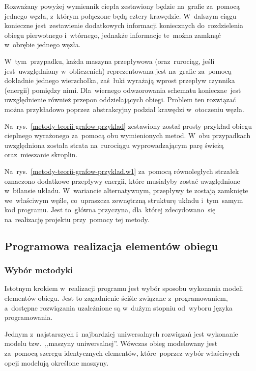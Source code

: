 Rozważany powyżej wymiennik ciepła zestawiony będzie na~grafie za~pomocą
jednego węzła, z~którym połączone będą cztery krawędzie. W~dalszym ciągu
konieczne jest~zestawienie dodatkowych informacji koniecznych
do~rozdzielenia obiegu pierwotnego i~wtórnego, jednakże informacje
te~można zamknąć w~obrębie jednego węzła.

W~tym~przypadku, każda maszyna przepływowa (oraz~rurociąg, jeśli
jest~uwzględniany w~obliczenich) reprezentowana jest na~grafie za~pomocą
dokładnie jednego wierzchołka, zaś~łuki wyrażają wprost przepływ
czynnika (energii) pomiędzy nimi. Dla~wiernego odwzorowania schematu
konieczne~jest uwzględnienie również przepon oddzielających obiegi.
Problem ten rozwiązać można przykładowo poprzez~abstrakcyjny podział
krawędzi w~otoczeniu węzła.

Na~rys.~\ref{metody-teorii-grafow-przyklad} zestawiony został prosty
przykład obiegu cieplnego wyrażonego za~pomocą obu wymienionych metod.
W~obu przypadkach uwzględniona została strata na~rurociągu
wyprowadzającym parę świeżą oraz~mieszanie skroplin.

Na~rys.~\ref{metody-teorii-grafow-przyklad.w1} za~pomocą równoległych
strzałek oznaczono dodatkowe przepływy energii, które musiałyby zostać
uwzględnione w~bilansie układu. W~wariancie alternatywnym, przepływy te
zostają zamknięte we~właściwym węźle, co~upraszcza zewnętrzną strukturę
układu i~tym~samym kod programu. Jest to~główna przyczyna, dla~której
zdecydowano~się na~realizację projektu przy~pomocy tej metody.


\subsection{Programowa realizacja elementów obiegu}

\subsubsection{Wybór metodyki}

Istotnym krokiem w~realizacji programu jest wybór sposobu wykonania
modeli elementów obiegu. Jest to zagadnienie ściśle związane
z~programowaniem, a~dostępne rozwiązania uzależnione są w~dużym stopniu
od~wyboru języka programowania.

Jednym z~najstarszych i~najbardziej uniwersalnych rozwiązań jest
wykonanie modelu tzw.~,,maszyny uniwersalnej''. Wówczas obieg modelowany
jest za~pomocą szeregu identycznych elementów, które~poprzez wybór
właściwych opcji modelują określone maszyny.

